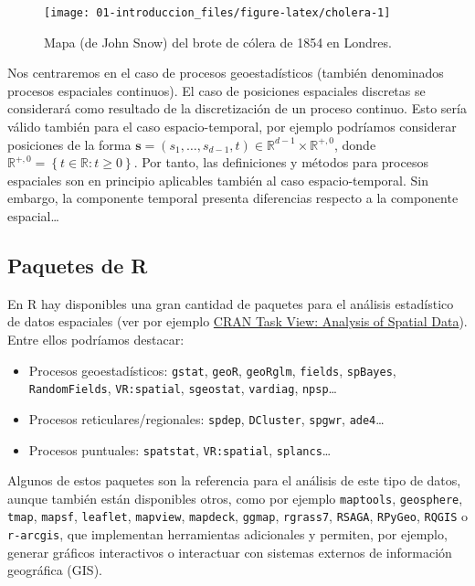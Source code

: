 \documentclass[
  spanish,
]{book}
\theoremstyle{break}
\theoremstyle{definition}
\theoremstyle{definition}
\theoremstyle{definition}
\theoremstyle{definition}
\theoremstyle{remark}
\begin{document}
\begin{itemize}
  \begin{figure}[!htb]

  {\centering \texttt{[image: 01-introduccion\_files/figure-latex/cholera-1]} 

  }

  \caption{Mapa (de John Snow) del brote de cólera de 1854 en Londres.}\label{fig:cholera}
  \end{figure}
\end{itemize}

Nos centraremos en el caso de procesos geoestadísticos (también denominados procesos espaciales continuos).
El caso de posiciones espaciales discretas se considerará como resultado de la discretización de un proceso continuo.
Esto sería válido también para el caso espacio-temporal, por ejemplo podríamos considerar posiciones de la forma \(\mathbf{s}=(s_{1} , \ldots,s_{d-1} ,t) \in \mathbb{R}^{d-1} \times \mathbb{R}^{+,0}\), donde \(\mathbb{R}^{+,0} = \left\{ t \in \mathbb{R} : t \geq 0 \right\}\).
Por tanto, las definiciones y métodos para procesos espaciales son en principio aplicables también al caso espacio-temporal.
Sin embargo, la componente temporal presenta diferencias respecto a la componente espacial\ldots{}

\hypertarget{paquetes-r}{%
\subsection{Paquetes de R}\label{paquetes-r}}

En R hay disponibles una gran cantidad de paquetes para el análisis estadístico de datos espaciales (ver por ejemplo \href{http://cran.r-project.org/web/views/Spatial.html}{CRAN Task View: Analysis of Spatial Data}).
Entre ellos podríamos destacar:

\begin{itemize}
\item
  Procesos geoestadísticos: \texttt{gstat}, \texttt{geoR}, \texttt{geoRglm}, \texttt{fields},
  \texttt{spBayes}, \texttt{RandomFields}, \texttt{VR:spatial}, \texttt{sgeostat}, \texttt{vardiag}, \texttt{npsp}\ldots{}
\item
  Procesos reticulares/regionales: \texttt{spdep}, \texttt{DCluster}, \texttt{spgwr},
  \texttt{ade4}\ldots{}
\item
  Procesos puntuales: \texttt{spatstat}, \texttt{VR:spatial}, \texttt{splancs}\ldots{}
\end{itemize}

Algunos de estos paquetes son la referencia para el análisis de este tipo de datos,
aunque también están disponibles otros, como por ejemplo \texttt{maptools}, \texttt{geosphere}, \texttt{tmap}, \texttt{mapsf}, \texttt{leaflet}, \texttt{mapview}, \texttt{mapdeck}, \texttt{ggmap}, \texttt{rgrass7}, \texttt{RSAGA}, \texttt{RPyGeo}, \texttt{RQGIS} o \texttt{r-arcgis}, que implementan herramientas adicionales y permiten, por ejemplo, generar gráficos interactivos o interactuar con sistemas externos de información geográfica (GIS).
\end{document}
